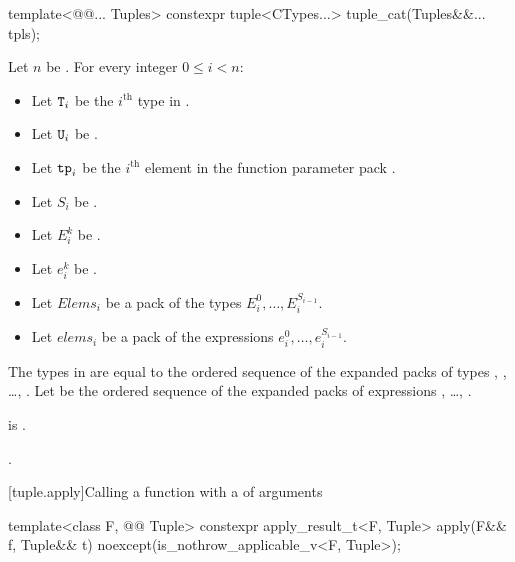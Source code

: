 \begin{itemdecl}
template<@@... Tuples>
  constexpr tuple<CTypes...> tuple_cat(Tuples&&... tpls);
\end{itemdecl}

\begin{itemdescr}
\pnum
Let $n$ be .
For every integer $0 \leq i < n$:
\begin{itemize}
\item
Let $\texttt{\protect T}_i$ be the $i^\text{th}$ type in .
\item
Let $\texttt{\protect U}_i$ be .
\item
Let $\texttt{\protect tp}_i$ be the $i^\text{th}$ element
in the function parameter pack .
\item
Let $S_i$ be .
\item
Let $E_i^k$ be .
\item
Let $e_i^k$ be .
\item
Let $Elems_i$ be a pack of the types $E_i^0, \dotsc, E_i^{S_{i-1}}$.
\item
Let $elems_i$ be a pack of the expressions $e_i^0, \dotsc, e_i^{S_{i-1}}$.
\end{itemize}
The types in  are equal to the ordered sequence of
the expanded packs of types
, , \ldots, .
Let  be the ordered sequence of
the expanded packs of expressions
, \ldots, .

\pnum
\mandates
{} is .

\pnum
\returns
{}.
\end{itemdescr}

[tuple.apply]{Calling a function with a  of arguments}

%
\begin{itemdecl}
template<class F, @@ Tuple>
  constexpr apply_result_t<F, Tuple> apply(F&& f, Tuple&& t)
    noexcept(is_nothrow_applicable_v<F, Tuple>);
\end{itemdecl}

